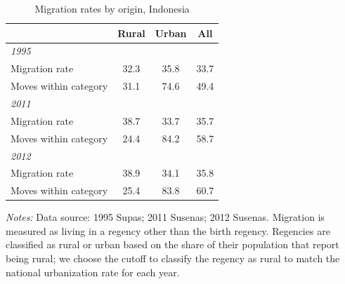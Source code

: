 \begin{table} \begin{small} \begin{center}\begin{threeparttable}[b] \caption{Migration rates by origin, Indonesia} \label{Migration rates by origin, Indonesia} \begin{tabular}{l*{3}c} \toprule
                    &       Rural&       Urban&         All\\
\midrule
\multicolumn{4}{l}{\emph{1995}} \\Migration rate      &        32.3&        35.8&        33.7\\
Moves within category&        31.1&        74.6&        49.4\\
\multicolumn{4}{l}{\emph{2011}} \\Migration rate      &        38.7&        33.7&        35.7\\
Moves within category&        24.4&        84.2&        58.7\\
\multicolumn{4}{l}{\emph{2012}} \\Migration rate      &        38.9&        34.1&        35.8\\
Moves within category&        25.4&        83.8&        60.7\\
\bottomrule \end{tabular} \label{} \begin{tablenotes} \item {\footnotesize \emph{Notes: } Data source:  1995 Supas; 2011 Susenas; 2012 Susenas. Migration is measured as living in a regency other than the birth regency. Regencies are classified as rural or urban based on the share of their population that report being rural; we choose the cutoff to classify the regency as rural to match the national urbanization rate for each year. } \end{tablenotes} \end{threeparttable} \end{center} \end{small} \end{table}
